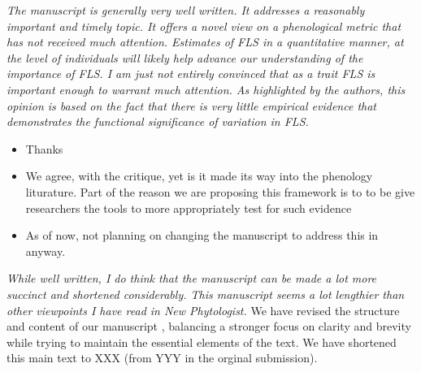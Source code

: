 \documentclass{article}[11pt]
\begin{document}
\emph{The manuscript is generally very well written. It addresses a reasonably important and timely topic. It offers a novel view on a phenological metric that has not received much attention. Estimates of FLS in a quantitative manner, at the level of individuals will likely help advance our understanding of the importance of FLS. I am just not entirely convinced that as a trait FLS is important enough to warrant much attention. As highlighted by the authors, this opinion is based on the fact that there is very little empirical evidence that demonstrates the functional significance of variation in FLS.}
\begin{itemize}
\item Thanks
\item We agree, with the critique, yet is it made its way into the phenology liturature. Part of the reason we are proposing this framework is to to be give researchers the tools to more appropriately test for such evidence
\item As of now, not planning on changing the manuscript to address this in anyway.
\end{itemize}
\emph{While well written, I do think that the manuscript can be made a lot more succinct and shortened considerably. This manuscript seems a lot lengthier than other viewpoints I have read in New Phytologist.}
We have revised the structure and content of our manuscript , balancing a stronger focus on clarity and brevity while trying to maintain the essential elements of the text. We have shortened this main text to XXX (from YYY in the orginal submission).\\
\end{document}
